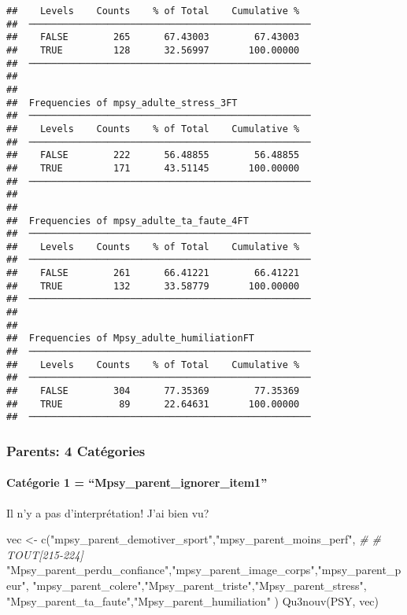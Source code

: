 \documentclass[
]{article}
\newenvironment{Shaded}{\begin{snugshade}}{\end{snugshade}}
\newcommand{\CommentTok}[1]{\textcolor[rgb]{0.56,0.35,0.01}{\textit{#1}}}
\newcommand{\FunctionTok}[1]{\textcolor[rgb]{0.00,0.00,0.00}{#1}}
\newcommand{\NormalTok}[1]{#1}
\newcommand{\OtherTok}[1]{\textcolor[rgb]{0.56,0.35,0.01}{#1}}
\newcommand{\StringTok}[1]{\textcolor[rgb]{0.31,0.60,0.02}{#1}}
\begin{document}
\begin{verbatim}
##    Levels    Counts    % of Total    Cumulative %   
##  ────────────────────────────────────────────────── 
##    FALSE        265      67.43003        67.43003   
##    TRUE         128      32.56997       100.00000   
##  ────────────────────────────────────────────────── 
## 
## 
##  Frequencies of mpsy_adulte_stress_3FT              
##  ────────────────────────────────────────────────── 
##    Levels    Counts    % of Total    Cumulative %   
##  ────────────────────────────────────────────────── 
##    FALSE        222      56.48855        56.48855   
##    TRUE         171      43.51145       100.00000   
##  ────────────────────────────────────────────────── 
## 
## 
##  Frequencies of mpsy_adulte_ta_faute_4FT            
##  ────────────────────────────────────────────────── 
##    Levels    Counts    % of Total    Cumulative %   
##  ────────────────────────────────────────────────── 
##    FALSE        261      66.41221        66.41221   
##    TRUE         132      33.58779       100.00000   
##  ────────────────────────────────────────────────── 
## 
## 
##  Frequencies of Mpsy_adulte_humiliationFT           
##  ────────────────────────────────────────────────── 
##    Levels    Counts    % of Total    Cumulative %   
##  ────────────────────────────────────────────────── 
##    FALSE        304      77.35369        77.35369   
##    TRUE          89      22.64631       100.00000   
##  ──────────────────────────────────────────────────
\end{verbatim}

\hypertarget{parents-4-catuxe9gories}{%
\subsubsection{Parents: 4 Catégories}\label{parents-4-catuxe9gories}}

\hypertarget{catuxe9gorie-1-mpsy_parent_ignorer_item1}{%
\paragraph{Catégorie 1 =
``Mpsy\_parent\_ignorer\_item1''}\label{catuxe9gorie-1-mpsy_parent_ignorer_item1}}

Il n'y a pas d'interprétation! J'ai bien vu?

\begin{Shaded}
\begin{Highlighting}[]
\NormalTok{vec }\OtherTok{\textless{}{-}} \FunctionTok{c}\NormalTok{(}\StringTok{"mpsy\_parent\_demotiver\_sport"}\NormalTok{,}\StringTok{"mpsy\_parent\_moins\_perf"}\NormalTok{,         }\CommentTok{\#  \# TOUT[215{-}224]}
  \StringTok{"Mpsy\_parent\_perdu\_confiance"}\NormalTok{,}\StringTok{"mpsy\_parent\_image\_corps"}\NormalTok{,}\StringTok{"mpsy\_parent\_peur"}\NormalTok{, }
    \StringTok{"mpsy\_parent\_colere"}\NormalTok{,}\StringTok{"Mpsy\_parent\_triste"}\NormalTok{,}\StringTok{"Mpsy\_parent\_stress"}\NormalTok{,}
    \StringTok{"Mpsy\_parent\_ta\_faute"}\NormalTok{,}\StringTok{"Mpsy\_parent\_humiliation"}
\NormalTok{     )}
\FunctionTok{Qu3nouv}\NormalTok{(PSY, vec)}
\end{Highlighting}
\end{Shaded}
\end{document}

